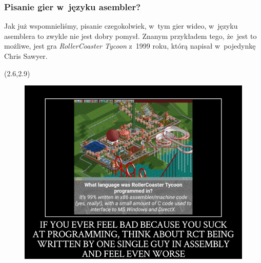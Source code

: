 \documentclass[10pt,t]{beamer}
\begin{document}
\begin{frame}
  \frametitle{Pisanie gier w~języku asembler?}

  \vspace{-0.75em}



  Jak już wspomnieliśmy, pisanie czegokolwiek, w~tym gier wideo, w~języku
  asemblera to zwykle nie jest dobry pomysł. Znanym przykładem tego, że~jest
  to możliwe, jest gra \textit{RollerCoaster Tycoon} z~1999 roku, którą
  napisał \alert{w~pojedynkę} Chris Sawyer.




  \begin{textblock}{8}(2.6,2.9)

    \begin{figure}

      \label{fig:Feel-even-worse}



      \includegraphics[scale=0.27]
      {./Presentations-pictures/Feel-even-worse.jpg}

    \end{figure}

  \end{textblock}

\end{frame}
\end{document}
